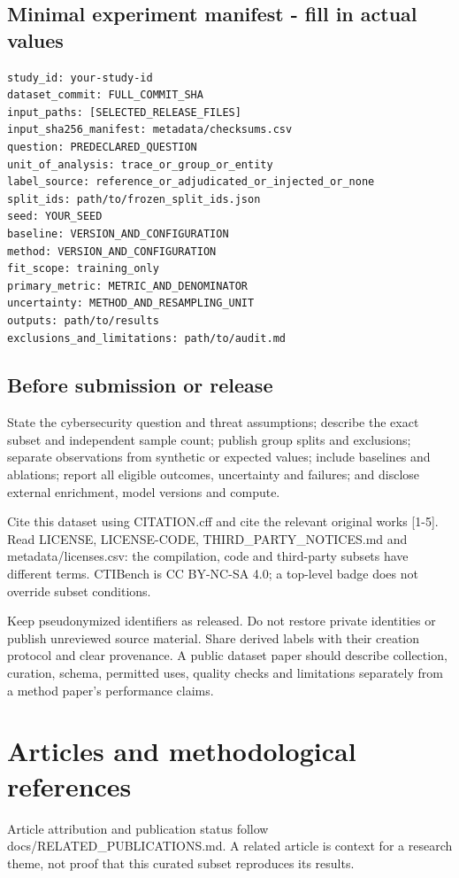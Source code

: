 \subsection*{Minimal experiment manifest - fill in actual values}
\begin{Verbatim}[fontsize=\footnotesize,breaklines=true,frame=single,rulecolor=\color{rulegray},framesep=8pt]
study_id: your-study-id
dataset_commit: FULL_COMMIT_SHA
input_paths: [SELECTED_RELEASE_FILES]
input_sha256_manifest: metadata/checksums.csv
question: PREDECLARED_QUESTION
unit_of_analysis: trace_or_group_or_entity
label_source: reference_or_adjudicated_or_injected_or_none
split_ids: path/to/frozen_split_ids.json
seed: YOUR_SEED
baseline: VERSION_AND_CONFIGURATION
method: VERSION_AND_CONFIGURATION
fit_scope: training_only
primary_metric: METRIC_AND_DENOMINATOR
uncertainty: METHOD_AND_RESAMPLING_UNIT
outputs: path/to/results
exclusions_and_limitations: path/to/audit.md
\end{Verbatim}
\subsection*{Before submission or release}
State the cybersecurity question and threat assumptions; describe the exact subset and independent sample count; publish group splits and exclusions; separate observations from synthetic or expected values; include baselines and ablations; report all eligible outcomes, uncertainty and failures; and disclose external enrichment, model versions and compute.

Cite this dataset using CITATION.cff and cite the relevant original works [1-5]. Read LICENSE, LICENSE-CODE, THIRD\_PARTY\_NOTICES.md and metadata/licenses.csv: the compilation, code and third-party subsets have different terms. CTIBench is CC BY-NC-SA 4.0; a top-level badge does not override subset conditions.

Keep pseudonymized identifiers as released. Do not restore private identities or publish unreviewed source material. Share derived labels with their creation protocol and clear provenance. A public dataset paper should describe collection, curation, schema, permitted uses, quality checks and limitations separately from a method paper's performance claims.

\clearpage\section{Articles and methodological references}
Article attribution and publication status follow docs/RELATED\_PUBLICATIONS.md. A related article is context for a research theme, not proof that this curated subset reproduces its results.

